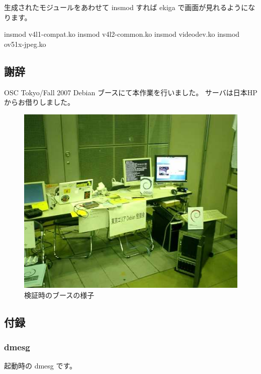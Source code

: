 \documentclass[mingoth,a4paper]{jsarticle}
\begin{document}
生成されたモジュールをあわせて insmod すれば ekiga で画面が見れるようになります。

\begin{commandline}
insmod v4l1-compat.ko
insmod v4l2-common.ko
insmod videodev.ko
insmod ov51x-jpeg.ko
\end{commandline}

\subsection{謝辞}

OSC Tokyo/Fall 2007 Debian ブースにて本作業を行いました。
サーバは日本HPからお借りしました。

\begin{figure}[H]
\begin{center}
  \includegraphics[width=0.5\hsize]{image200710/booth.jpg}
\end{center}
\caption{検証時のブースの様子}
\label{fig:oscfalldebbooth}
\end{figure}
\subsection{付録}

\subsubsection{dmesg}

起動時の dmesg です。
\end{document}
